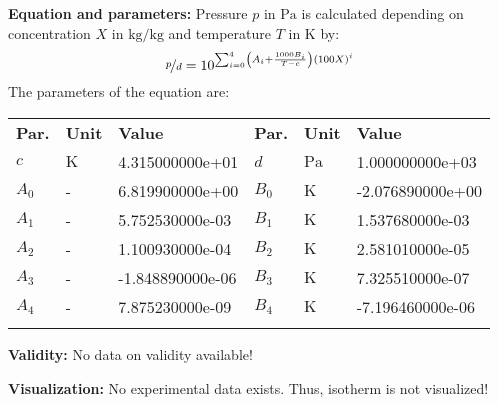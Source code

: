 \textbf{Equation and parameters:}
\newline
%
Pressure $p$ in $\si{\pascal}$ is calculated depending on concentration $X$ in $\si{\kilogram\per\kilogram}$ and  temperature $T$ in $\si{\kelvin}$ by:
%
\begin{equation*}
\nicefrac{p}{d} = 10 ^ { \sum_{i=0}^{4} \left( A_i + \frac{1000 B_i}{T - c} \right) \left( 100 X \right) ^{i}}
\end{equation*}
%
The parameters of the equation are:
%
\begin{longtable}[l]{lll|lll}
\toprule
\addlinespace
\textbf{Par.} & \textbf{Unit} & \textbf{Value} &	\textbf{Par.} & \textbf{Unit} & \textbf{Value} \\
\addlinespace
\midrule
\endhead

\bottomrule
\endfoot
\bottomrule
\endlastfoot
\addlinespace

$c$ & $\si{\kelvin}$ & 4.315000000e+01 & $d$ & $\si{\pascal}$ & 1.000000000e+03 \\
$A_0$ & - & 6.819900000e+00 & $B_0$ & $\si{\kelvin}$ & -2.076890000e+00 \\
$A_1$ & - & 5.752530000e-03 & $B_1$ & $\si{\kelvin}$ & 1.537680000e-03 \\
$A_2$ & - & 1.100930000e-04 & $B_2$ & $\si{\kelvin}$ & 2.581010000e-05 \\
$A_3$ & - & -1.848890000e-06 & $B_3$ & $\si{\kelvin}$ & 7.325510000e-07 \\
$A_4$ & - & 7.875230000e-09 & $B_4$ & $\si{\kelvin}$ & -7.196460000e-06 \\

\addlinespace\end{longtable}

\textbf{Validity:}
\newline
No data on validity available!
\newline

\textbf{Visualization:}
%
\newline
No experimental data exists. Thus, isotherm is not visualized!
%

\FloatBarrier
\newpage

